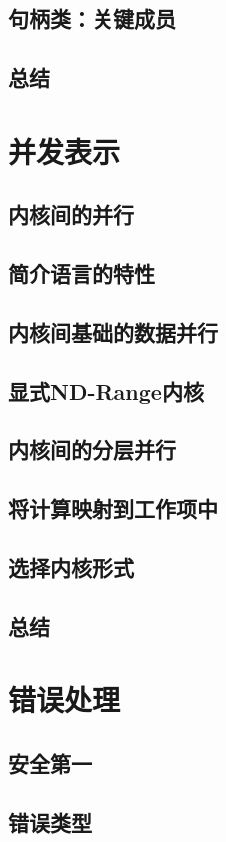 \documentclass[11pt,a4paper,UTF8]{ctexart}
\begin{document}
		\subsection{句柄类：关键成员}
		\subsection{总结}
	\section{并发表示}
		\subsection{内核间的并行}
		\subsection{简介语言的特性}
		\subsection{内核间基础的数据并行}
		\subsection{显式ND-Range内核}
		\subsection{内核间的分层并行}
		\subsection{将计算映射到工作项中}
		\subsection{选择内核形式}
		\subsection{总结}
	\section{错误处理}
		\subsection{安全第一}
		\subsection{错误类型}
\end{document}
